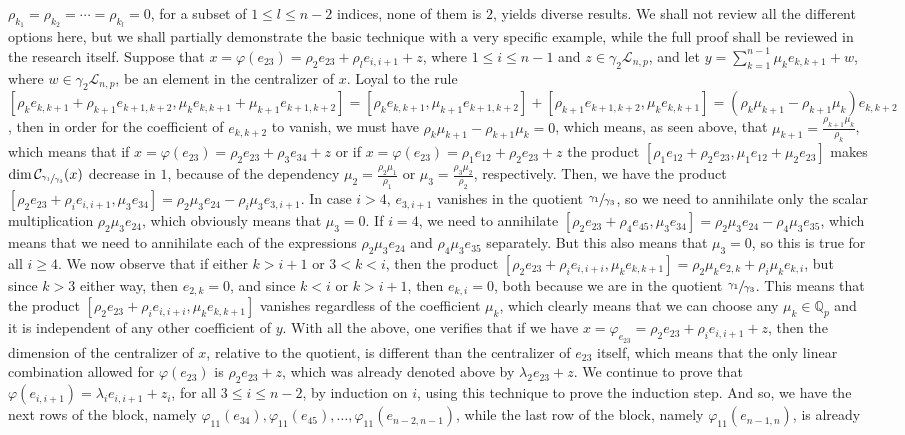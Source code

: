\documentclass[12pt]{article}
\begin{document}
$\rho_{k_1}=\rho_{k_2}=\cdots=\rho_{k_l}=0$, for a subset of $1\leq l\leq n-2$ indices, none of them is $2$, yields diverse results. We shall not review all the different options here, but we shall partially demonstrate the basic technique with a very specific example, while the full proof shall be reviewed in the research itself. Suppose that $x=\varphi(e_{23})=\rho_2 e_{23}+\rho_l e_{i,i+1}+z$, where $1\leq i\leq n-1$ and $z\in\gamma_2\mathcal{L}_{n,p}$, and let $y=\sum_{k=1}^{n-1}\mu_k e_{k,k+1}+w$, where $w\in\gamma_2\mathcal{L}_{n,p}$, be an element in the centralizer of $x$. Loyal to the rule $[\rho_k e_{k,k+1}+\rho_{k+1} e_{k+1,k+2},\mu_k e_{k,k+1}+\mu_{k+1} e_{k+1,k+2}]=[\rho_k e_{k,k+1},\mu_{k+1} e_{k+1,k+2}]+[\rho_{k+1} e_{k+1,k+2},\mu_k e_{k,k+1}]=(\rho_k\mu_{k+1}-\rho_{k+1}\mu_k)e_{k,k+2}$, then in order for the coefficient of $e_{k,k+2}$ to vanish, we must have $\rho_k\mu_{k+1}-\rho_{k+1}\mu_k=0$, which means, as seen above, that $\mu_{k+1}=\frac{\rho_{k+1}\mu_k}{\rho_k}$, which means that if $x=\varphi(e_{23})=\rho_2 e_{23}+\rho_3 e_{34}+z$ or if $x=\varphi(e_{23})=\rho_1 e_{12}+\rho_2 e_{23}+z$ the product $[\rho_1 e_{12}+\rho_2 e_{23},\mu_1 e_{12}+\mu_2 e_{23}]$ makes $\dim\mathcal{C}_{\sfrac{\gamma_1}{\gamma_3}}(x)$ decrease in $1$, because of the dependency $\mu_2=\frac{\rho_2\mu_1}{\rho_1}$ or $\mu_3=\frac{\rho_3\mu_2}{\rho_2}$, respectively. Then, we have the product $[\rho_2 e_{23}+\rho_i e_{i,i+1},\mu_3 e_{34}]=\rho_2\mu_3 e_{24}-\rho_i\mu_3 e_{3,i+1}$. In case $i>4$, $e_{3,i+1}$ vanishes in the quotient $\sfrac{\gamma_1}{\gamma_3}$, so we need to annihilate only the scalar multiplication $\rho_2\mu_3 e_{24}$, which obviously means that $\mu_3=0$. If $i=4$, we need to annihilate $[\rho_2 e_{23}+\rho_4 e_{45},\mu_3 e_{34}]=\rho_2\mu_3 e_{24}-\rho_4\mu_3 e_{35}$, which means that we need to annihilate each of the expressions $\rho_2\mu_3 e_{24}$ and $\rho_4\mu_3 e_{35}$ separately. But this also means that $\mu_3=0$, so this is true for all $i\geq 4$. We now observe that if either $k>i+1$ or $3<k<i$, then the product $[\rho_2 e_{23}+\rho_i e_{i,i+i},\mu_k e_{k,k+1}]=\rho_2\mu_k e_{2,k}+\rho_i\mu_k e_{k,i}$, but since $k>3$ either way, then $e_{2,k}=0$, and since $k<i$ or $k>i+1$, then $e_{k,i}=0$, both because we are in the quotient $\sfrac{\gamma_1}{\gamma_3}$. This means that the product $[\rho_2 e_{23}+\rho_i e_{i,i+i},\mu_k e_{k,k+1}]$ vanishes regardless of the coefficient $\mu_k$, which clearly means that we can choose any $\mu_k\in\mathbb{Q}_p$ and it is independent of any other coefficient of $y$. With all the above, one verifies that if we have $x=\varphi_{e_{23}}=\rho_2 e_{23}+\rho_i e_{i,i+1}+z$, then the dimension of the centralizer of $x$, relative to the quotient, is different than the centralizer of $e_{23}$ itself, which means that the only linear combination allowed for $\varphi(e_{23})$ is $\rho_2 e_{23}+z$, which was already denoted above by $\lambda_2 e_{23}+z$. We continue to prove that $\varphi(e_{i,i+1})=\lambda_i e_{i,i+1}+z_i$, for all $3\leq i\leq n-2$, by induction on $i$, using this technique to prove the induction step. And so, we have the next rows of the block, namely $\varphi_{11}(e_{34}),\varphi_{11}(e_{45}),\dots,\varphi_{11}(e_{n-2,n-1})$, while the last row of the block, namely $\varphi_{11}(e_{n-1,n})$, is already 
\end{document}
